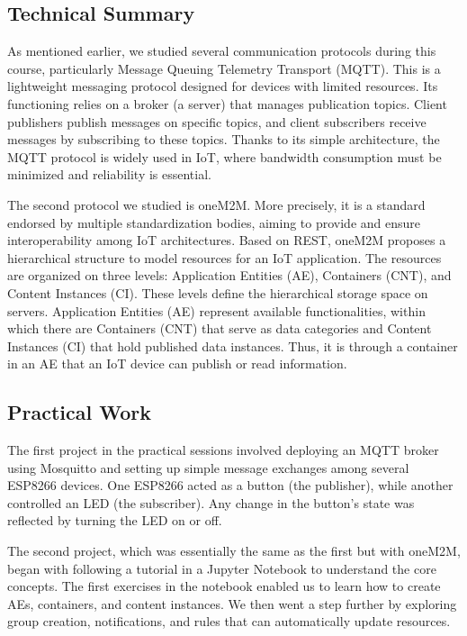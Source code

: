 \subsection{Technical Summary}
\indent \indent As mentioned earlier, we studied several communication protocols during this course, particularly Message Queuing Telemetry Transport (MQTT). This is a lightweight messaging protocol designed for devices with limited resources. Its functioning relies on a broker (a server) that manages publication topics. Client publishers publish messages on specific topics, and client subscribers receive messages by subscribing to these topics.
Thanks to its simple architecture, the MQTT protocol is widely used in IoT, where bandwidth consumption must be minimized and reliability is essential.
\vspace{0.25cm}

\noindent The second protocol we studied is oneM2M. More precisely, it is a standard endorsed by multiple standardization bodies, aiming to provide and ensure interoperability among IoT architectures. Based on REST, oneM2M proposes a hierarchical structure to model resources for an IoT application. The resources are organized on three levels: Application Entities (AE), Containers (CNT), and Content Instances (CI). These levels define the hierarchical storage space on servers. Application Entities (AE) represent available functionalities, within which there are Containers (CNT) that serve as data categories and Content Instances (CI) that hold published data instances.
Thus, it is through a container in an AE that an IoT device can publish or read information.

\subsection{Practical Work}
\indent \indent The first project in the practical sessions involved deploying an MQTT broker using Mosquitto and setting up simple message exchanges among several ESP8266 devices. One ESP8266 acted as a button (the publisher), while another controlled an LED (the subscriber). Any change in the button's state was reflected by turning the LED on or off.
\vspace{0.25cm}

\noindent The second project, which was essentially the same as the first but with oneM2M, began with following a tutorial in a Jupyter Notebook to understand the core concepts. The first exercises in the notebook enabled us to learn how to create AEs, containers, and content instances. We then went a step further by exploring group creation, notifications, and rules that can automatically update resources.
\vspace{0.25cm}

